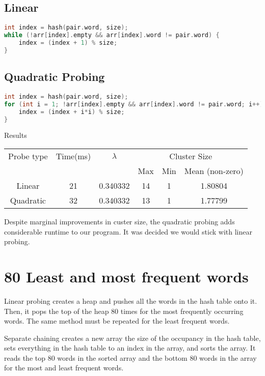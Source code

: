 \documentclass[12pt]{article}
\begin{document}
\subsection{Linear}
\begin{lstlisting}[language=C++]
int index = hash(pair.word, size);
while (!arr[index].empty && arr[index].word != pair.word) {
    index = (index + 1) % size;
}
\end{lstlisting}

\subsection{Quadratic Probing}
\begin{lstlisting}[language=C++]
int index = hash(pair.word, size);
for (int i = 1; !arr[index].empty && arr[index].word != pair.word; i++) {
    index = (index + i*i) % size;
}
\end{lstlisting}

\begin{center}
Results\\
\begin{tabular}{|c|c|c|c|c|c|}
\hline
Probe type & Time(ms) & $\lambda$ & \multicolumn{3}{|c|}{Cluster Size} \\
 & & & Max & Min & Mean (non-zero) \\
\hline
Linear & 21 & 0.340332 & 14 & 1 & 1.80804\\
Quadratic & 32 & 0.340332 & 13 & 1 & 1.77799\\
\hline
\end{tabular}
\end{center}

Despite marginal improvements in custer size, the quadratic probing adds considerable runtime to our program. It was decided we would stick with linear probing.

\section{80 Least and most frequent words}

Linear probing creates a heap and pushes all the words in the hash table onto it. Then, it pops the top of the heap 80 times for the most frequently occurring words. The same method must be repeated for the least frequent words.

Separate chaining creates a new array the size of the occupancy in the hash table, sets everything in the hash table to an index in the array, and sorts the array. It reads the top 80 words in the sorted array and the bottom 80 words in the array for the most and least frequent words.
\end{document}
